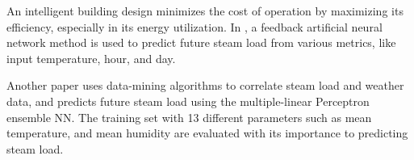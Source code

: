 An intelligent building design minimizes 
the cost of operation by maximizing its efficiency,
especially in its energy utilization. In 
\cite{gonzalez_detailed_2002}, a feedback artificial neural
network method is used to predict future steam load from various
metrics, like input temperature, hour, and day.

Another paper \cite{kusiak_data-driven_2010} uses data-mining algorithms
to correlate steam load and weather data, and predicts
future steam load using the multiple-linear Perceptron ensemble
NN. The training set with 13 different parameters such as mean temperature,
and mean humidity are evaluated with its importance to predicting steam load.

